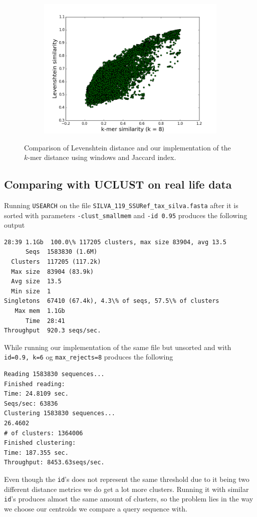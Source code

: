 \begin{figure}
  \centering
  \begin{subfigure}[b]{0.5\textwidth}
    \includegraphics[scale=0.34]{graphics/k8.png}
  \end{subfigure}
  \caption{Comparison of Levenshtein distance and our implementation of the
  $k$-mer distance using windows and Jaccard index.}
  \label{fig:Levenshtein_vs_Kmer}
\end{figure}





\subsection{Comparing with UCLUST on real life data}
Running \texttt{USEARCH} on the file \texttt{SILVA\_119\_SSURef\_tax\_silva.fasta} after it is sorted with parameters \texttt{-clust\_smallmem} and \texttt{-id 0.95} produces the following output

\begin{lstlisting}
28:39 1.1Gb  100.0\% 117205 clusters, max size 83904, avg 13.5
      Seqs  1583830 (1.6M)
  Clusters  117205 (117.2k)
  Max size  83904 (83.9k)
  Avg size  13.5
  Min size  1
Singletons  67410 (67.4k), 4.3\% of seqs, 57.5\% of clusters
   Max mem  1.1Gb
      Time  28:41
Throughput  920.3 seqs/sec.
\end{lstlisting}
While running our implementation of the same file but unsorted and with \texttt{id=0.9, k=6} og \texttt{max\_rejects=8} produces the following
\begin{lstlisting}
Reading 1583830 sequences...
Finished reading:
Time: 24.8109 sec.
Seqs/sec: 63836
Clustering 1583830 sequences...
26.4602
# of clusters: 1364006
Finished clustering:
Time: 187.355 sec.
Throughput: 8453.63seqs/sec.
\end{lstlisting}
Even though the \texttt{id}'s does not represent the same threshold due to it
being two different distance metrics we do get a lot more clusters. Running
it with similar \texttt{id}'s produces almost the same amount of clusters, so
the problem lies in the way we choose our centroids we compare a query
sequence with.

